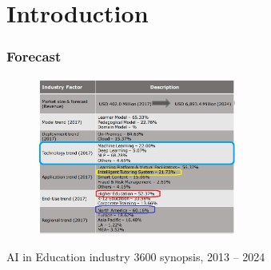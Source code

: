 \documentclass{beamer}
\begin{document}
\section{Introduction} %
\begin{frame}
\frametitle{Forecast}

\begin{center}
	

		\begin{figure}
			\includegraphics[width=65mm]{market2.png}
				
			
		\end{figure}
{\footnotesize 	AI in Education industry 3600 synopsis, 2013 – 2024}
	\begin{thebibliography}{01}
	\end{thebibliography}

\end{center}




\end{frame}
\end{document}
